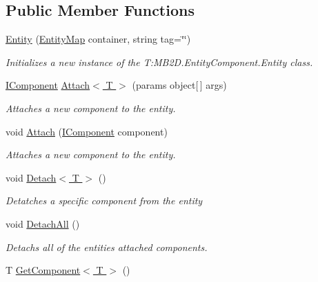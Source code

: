 \subsection*{Public Member Functions}
\begin{DoxyCompactItemize}
\item 
\hyperlink{class_m_b2_d_1_1_entity_component_1_1_entity_a6decb855bea1bcf18cd6c2869ebc16a6}{Entity} (\hyperlink{class_m_b2_d_1_1_entity_component_1_1_entity_map}{Entity\+Map} container, string tag=\char`\"{}\char`\"{})
\begin{DoxyCompactList}\small\item\em Initializes a new instance of the T\+:\+M\+B2\+D.\+Entity\+Component.\+Entity class. \end{DoxyCompactList}\item 
\hyperlink{interface_m_b2_d_1_1_entity_component_1_1_i_component}{I\+Component} \hyperlink{class_m_b2_d_1_1_entity_component_1_1_entity_a53ffea8d43423903712540fc2df6b82d}{Attach$<$ T $>$} (params object\mbox{[}$\,$\mbox{]} args)
\begin{DoxyCompactList}\small\item\em Attaches a new component to the entity. \end{DoxyCompactList}\item 
void \hyperlink{class_m_b2_d_1_1_entity_component_1_1_entity_aa86d1be62df6d89b981d1000c856a306}{Attach} (\hyperlink{interface_m_b2_d_1_1_entity_component_1_1_i_component}{I\+Component} component)
\begin{DoxyCompactList}\small\item\em Attaches a new component to the entity. \end{DoxyCompactList}\item 
void \hyperlink{class_m_b2_d_1_1_entity_component_1_1_entity_a9194f3b1f3370d2ecb47efe077ba4050}{Detach$<$ T $>$} ()
\begin{DoxyCompactList}\small\item\em Detatches a specific component from the entity \end{DoxyCompactList}\item 
void \hyperlink{class_m_b2_d_1_1_entity_component_1_1_entity_a5c006a368383ba7b17653d9f958ceaf8}{Detach\+All} ()
\begin{DoxyCompactList}\small\item\em Detachs all of the entities attached components. \end{DoxyCompactList}\item 
T \hyperlink{class_m_b2_d_1_1_entity_component_1_1_entity_a637f3b4df5ecd5d4e6c7630740d1676f}{Get\+Component$<$ T $>$} ()

\end{DoxyCompactItemize}
